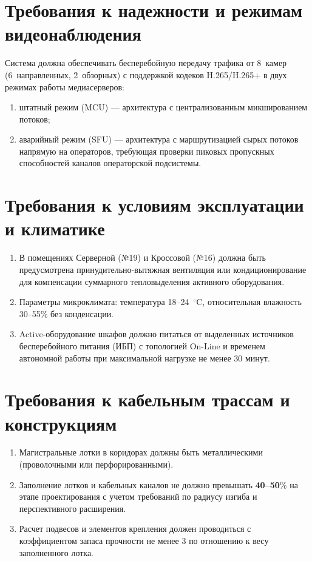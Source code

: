 \documentclass[a4paper,oneside,14pt]{extreport}
\begin{document}
\section{Требования к надежности и режимам видеонаблюдения}
Система должна обеспечивать бесперебойную передачу трафика от 8~камер (6~направленных, 2~обзорных) с поддержкой кодеков H.265/H.265+ в двух режимах работы медиасерверов:
\begin{enumerate}[label=\asbuk*)]
    \item штатный режим (MCU) --- архитектура с централизованным микшированием потоков;
    \item аварийный режим (SFU) --- архитектура с маршрутизацией сырых потоков напрямую на операторов, требующая проверки пиковых пропускных способностей каналов операторской подсистемы.
\end{enumerate}

\section{Требования к условиям эксплуатации и климатике}
\begin{enumerate}[label=\thesection.\arabic*]
    \item В помещениях Серверной (№19) и Кроссовой (№16) должна быть предусмотрена принудительно-вытяжная вентиляция или кондиционирование для компенсации суммарного тепловыделения активного оборудования.
    \item Параметры микроклимата: температура 18--24~$^\circ$C, относительная влажность 30--55\% без конденсации.
    \item Active-оборудование шкафов должно питаться от выделенных источников бесперебойного питания (ИБП) с топологией On-Line и временем автономной работы при максимальной нагрузке не менее 30 минут.
\end{enumerate}

\section{Требования к кабельным трассам и конструкциям}
\begin{enumerate}[label=\thesection.\arabic*]
    \item Магистральные лотки в коридорах должны быть металлическими (проволочными или перфорированными).
    \item Заполнение лотков и кабельных каналов не должно превышать \textbf{40--50}\% на этапе проектирования с учетом требований по радиусу изгиба и перспективного расширения.
    \item Расчет подвесов и элементов крепления должен проводиться с коэффициентом запаса прочности не менее 3 по отношению к весу заполненного лотка.
\end{enumerate}
\end{document}
